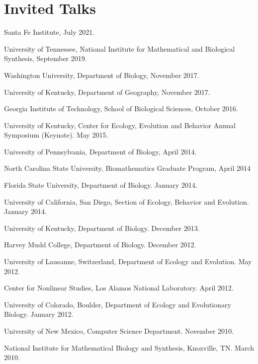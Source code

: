 \documentclass[11pt]{article}
\begin{document}
  \section{Invited Talks}
  \begin{compactlist}
  \item Santa Fe Institute, July 2021.
  \item University of Tennessee, National Institute for Mathematical and Biological Synthesis, September 2019.
  \item Washington University, Department of Biology, November 2017.
  \item University of Kentucky, Department of Geography, November 2017.
  \item Georgia Institute of Technology, School of Biological Sciences, October 2016.
  \item University of Kentucky, Center for Ecology, Evolution and Behavior Annual Symposium (Keynote). May 2015.
  \item University of Pennsylvania, Department of Biology, April 2014.
  \item North Carolina State University, Biomathematics Graduate Program, April 2014
  \item Florida State University, Department of Biology.  January 2014.
  \item University of California, San Diego, Section of Ecology, Behavior and Evolution.  January 2014.
  \item University of Kentucky, Department of Biology. December 2013.
  \item Harvey Mudd College, Department of Biology. December 2012.
  \item %
    University of Lausanne, Switzerland, Department of Ecology and Evolution. May 2012.
  \item %
    Center for Nonlinear Studies, Los Alamos National Laboratory. April 2012.
  \item %
    University of Colorado, Boulder, Department of Ecology and Evolutionary Biology. January 2012.
  \item %
    University of New Mexico, Computer Science Department. November 2010.
  \item %
    National Institute for Mathematical Biology and Synthesis, Knoxville, TN. March 2010.
  \end{compactlist}  
\end{document}
